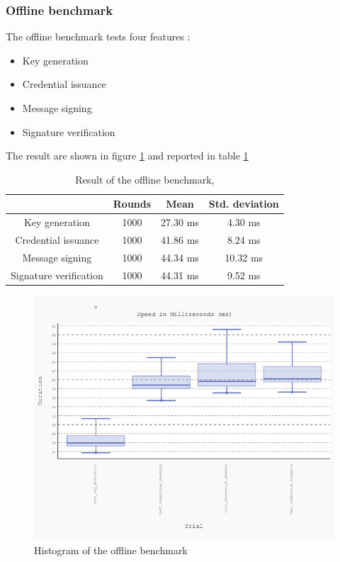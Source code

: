 \documentclass[10pt,conference,compsocconf]{IEEEtran}
\begin{document}
\subsubsection{Offline benchmark}
The offline benchmark tests four features :
\begin{itemize}
    \item Key generation
    \item Credential issuance
    \item Message signing
    \item Signature verification
\end{itemize}
The result are shown in figure \ref{benchoffline_fig}
and reported in table \ref{benchoffline}
\begin{table}
\begin{tabular}{|c|c|c|c|}
    \hline
                            & Rounds  & Mean      & Std. deviation  \\
    \hline
    Key generation          & 1000    & 27.30 ms  & 4.30 ms         \\
    \hline
    Credential issuance     & 1000    & 41.86 ms  & 8.24 ms         \\
    \hline
    Message signing         & 1000    & 44.34 ms  & 10.32 ms        \\
    \hline
    Signature verification  & 1000    & 44.31 ms  & 9.52 ms         \\
    \hline    
\end{tabular}
\caption{Result of the offline benchmark, }
\label{benchoffline}
\end{table}
\begin{figure}
    \includegraphics[width=\columnwidth]{benchmark.png} 
    \caption{Histogram of the offline benchmark}
    \label{benchoffline_fig}
\end{figure}
\end{document}
